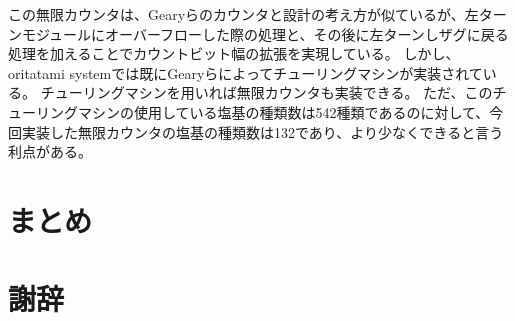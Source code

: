 \documentclass[a4,11pt]{article}
\begin{document}

この無限カウンタは、Gearyらのカウンタと設計の考え方が似ているが、左ターンモジュールにオーバーフローした際の処理と、その後に左ターンしザグに戻る処理を加えることでカウントビット幅の拡張を実現している。
しかし、oritatami systemでは既にGearyらによってチューリングマシンが実装されている\cite{GeMeScSe2018}。
チューリングマシンを用いれば無限カウンタも実装できる。
ただ、このチューリングマシンの使用している塩基の種類数は542種類であるのに対して、今回実装した無限カウンタの塩基の種類数は132であり、より少なくできると言う利点がある。




\section{まとめ}

\section{謝辞}



\end{document}
